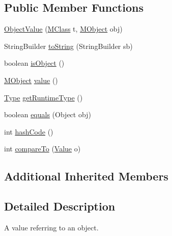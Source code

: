 \subsection*{Public Member Functions}
\begin{DoxyCompactItemize}
\item 
\hyperlink{classorg_1_1tzi_1_1use_1_1uml_1_1ocl_1_1value_1_1_object_value_a91bef991dbcedd45dec6499b06a9a675}{Object\-Value} (\hyperlink{interfaceorg_1_1tzi_1_1use_1_1uml_1_1mm_1_1_m_class}{M\-Class} t, \hyperlink{interfaceorg_1_1tzi_1_1use_1_1uml_1_1sys_1_1_m_object}{M\-Object} obj)
\item 
String\-Builder \hyperlink{classorg_1_1tzi_1_1use_1_1uml_1_1ocl_1_1value_1_1_object_value_a4e5ebf70eaade909de42f873eb9f6a84}{to\-String} (String\-Builder sb)
\item 
boolean \hyperlink{classorg_1_1tzi_1_1use_1_1uml_1_1ocl_1_1value_1_1_object_value_a8638a7731d7c395db447dbfe80315dbd}{is\-Object} ()
\item 
\hyperlink{interfaceorg_1_1tzi_1_1use_1_1uml_1_1sys_1_1_m_object}{M\-Object} \hyperlink{classorg_1_1tzi_1_1use_1_1uml_1_1ocl_1_1value_1_1_object_value_a856efe8c0ed725dd1bfa1e2c832b9397}{value} ()
\item 
\hyperlink{interfaceorg_1_1tzi_1_1use_1_1uml_1_1ocl_1_1type_1_1_type}{Type} \hyperlink{classorg_1_1tzi_1_1use_1_1uml_1_1ocl_1_1value_1_1_object_value_a33db6f1d094f1cfac3a4d213a07a44bc}{get\-Runtime\-Type} ()
\item 
boolean \hyperlink{classorg_1_1tzi_1_1use_1_1uml_1_1ocl_1_1value_1_1_object_value_a1048cbcb9c7163136e2b95381fecfd35}{equals} (Object obj)
\item 
int \hyperlink{classorg_1_1tzi_1_1use_1_1uml_1_1ocl_1_1value_1_1_object_value_afdbaadfe28ff3d95dc2208f51c2745b9}{hash\-Code} ()
\item 
int \hyperlink{classorg_1_1tzi_1_1use_1_1uml_1_1ocl_1_1value_1_1_object_value_a622a0152649db1b50240dfe9b967b902}{compare\-To} (\hyperlink{classorg_1_1tzi_1_1use_1_1uml_1_1ocl_1_1value_1_1_value}{Value} o)
\end{DoxyCompactItemize}
\subsection*{Additional Inherited Members}


\subsection{Detailed Description}
A value referring to an object.

